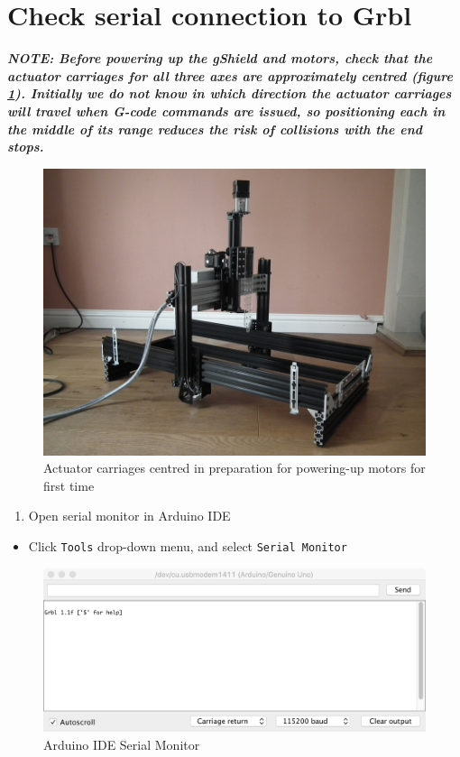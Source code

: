 \documentclass[]{book}
\providecommand{\tightlist}{%
  \setlength{\itemsep}{0pt}\setlength{\parskip}{0pt}}
\theoremstyle{definition}
\theoremstyle{definition}
\theoremstyle{definition}
\theoremstyle{remark}
\begin{document}
\section{Check serial connection to
Grbl}\label{check-serial-connection-to-grbl}

\emph{\textbf{NOTE: Before powering up the gShield and motors, check
that the actuator carriages for all three axes are approximately centred
(figure \ref{fig:actuatorsCentred}). Initially we do not know in which
direction the actuator carriages will travel when G-code commands are
issued, so positioning each in the middle of its range reduces the risk
of collisions with the end stops.}}

\begin{figure}

{\centering \includegraphics[width=0.75\linewidth]{images/actuator_carriages_centred} 

}

\caption{Actuator carriages centred in preparation for powering-up motors for first time}\label{fig:actuatorsCentred}
\end{figure}

\begin{enumerate}
\def\labelenumi{\arabic{enumi}.}
\tightlist
\item
  Open serial monitor in Arduino IDE
\end{enumerate}

\begin{itemize}
\tightlist
\item
  Click \texttt{Tools} drop-down menu, and select
  \texttt{Serial\ Monitor}
\end{itemize}

\begin{figure}

{\centering \includegraphics[width=0.75\linewidth]{images/Arduino_IDE_serial_monitor} 

}

\caption{Arduino IDE Serial Monitor}\label{fig:serialMonitor}
\end{figure}
\end{document}
